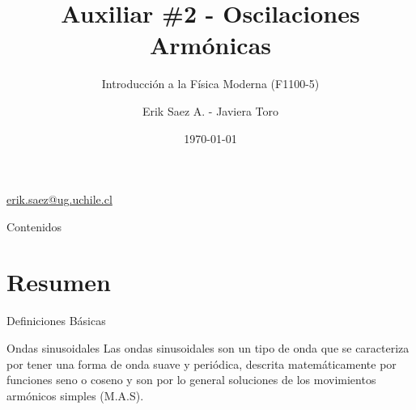 \documentclass[
    10pt,
    aspectratio=169,
    xcolor={dvipsnames},
    spanish,
    ]{beamer}
\title[Auxiliar \#2 - Oscilaciones Armónicas]{\bfseries Auxiliar \#2 - Oscilaciones Armónicas}
\subtitle{Introducción a la Física Moderna (F1100-5)}
\author[Erik Saez A.]{Erik Saez A. - Javiera Toro}
\institute[UChile]{Departamento de Ingeniería Eléctrica \\ Universidad de Chile}
\date{\today}
\begin{document}
\begin{frame}
  \titlepage
  \centering
   \href{mailto:erik.saez@ug.uchile.cl}{erik.saez@ug.uchile.cl} \hspace{.2cm}
\end{frame}

\begin{frame}{Contenidos}
  \tableofcontents
\end{frame}

\section{Resumen}

\begin{frame}{Definiciones Básicas}
  \begin{block}{Ondas sinusoidales}
    \footnotesize
    Las ondas sinusoidales son un tipo de onda que se caracteriza por tener una forma de onda suave y periódica, descrita matemáticamente por funciones seno o coseno y son por lo general soluciones de los movimientos armónicos simples (M.A.S).
  \end{block}
  

\end{frame}
\end{document}
